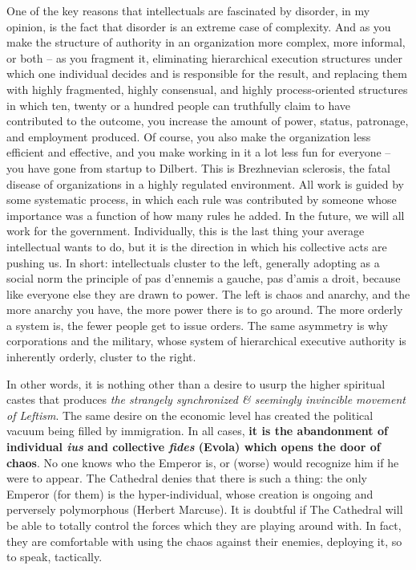 \begin{quotex}
One of the key reasons that intellectuals are fascinated by disorder, in my opinion, is the fact that disorder is an extreme case of complexity. And as you make the structure of authority in an organization more complex, more informal, or both -- as you fragment it, eliminating hierarchical execution structures under which one individual decides and is responsible for the result, and replacing them with highly fragmented, highly consensual, and highly process-oriented structures in which ten, twenty or a hundred people can truthfully claim to have contributed to the outcome, you increase the amount of power, status, patronage, and employment produced. Of course, you also make the organization less efficient and effective, and you make working in it a lot less fun for everyone -- you have gone from startup to Dilbert. This is Brezhnevian sclerosis, the fatal disease of organizations in a highly regulated environment. All work is guided by some systematic process, in which each rule was contributed by someone whose importance was a function of how many rules he added. In the future, we will all work for the government. Individually, this is the last thing your average intellectual wants to do, but it is the direction in which his collective acts are pushing us. In short: intellectuals cluster to the left, generally adopting as a social norm the principle of pas d'ennemis a gauche, pas d'amis a droit, because like everyone else they are drawn to power. The left is chaos and anarchy, and the more anarchy you have, the more power there is to go around. The more orderly a system is, the fewer people get to issue orders. The same asymmetry is why corporations and the military, whose system of hierarchical executive authority is inherently orderly, cluster to the right.
\end{quotex}


In other words, it is nothing other than a desire to usurp the higher spiritual castes that produces \emph{the strangely synchronized \& seemingly invincible movement of Leftism}. The same desire on the economic level has created the political vacuum being filled by immigration. In all cases, \textbf{it is the abandonment of individual \emph{ius} and collective \emph{fides} (Evola) which opens the door of chaos}. No one knows who the Emperor is, or (worse) would recognize him if he were to appear. The Cathedral denies that there is such a thing: the only Emperor (for them) is the hyper-individual, whose creation is ongoing and perversely polymorphous (Herbert Marcuse). It is doubtful if The Cathedral will be able to totally control the forces which they are playing around with. In fact, they are comfortable with using the chaos against their enemies, deploying it, so to speak, tactically.

